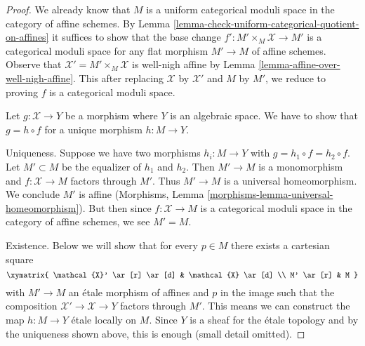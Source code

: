 \begin{proof}
We already know that $M$ is a uniform categorical moduli space
in the category of affine schemes. By
Lemma \ref{lemma-check-uniform-categorical-quotient-on-affines}
it suffices to show that the base change
$f' : M' \times_M \mathcal{X} \to M'$
is a categorical moduli space for any flat morphism
$M' \to M$ of affine schemes.
Observe that $\mathcal{X}' = M' \times_M \mathcal{X}$ is well-nigh affine by
Lemma \ref{lemma-affine-over-well-nigh-affine}.
This after replacing $\mathcal{X}$ by $\mathcal{X}'$
and $M$ by $M'$, we reduce to proving $f$ is a categorical
moduli space.

\medskip\noindent
Let $g : \mathcal{X} \to Y$ be a morphism where $Y$ is an algebraic space.
We have to show that $g = h \circ f$ for a unique morphism $h : M \to Y$.

\medskip\noindent
Uniqueness. Suppose we have two morphisms $h_i : M \to Y$ with
$g = h_1 \circ f = h_2 \circ f$. Let $M' \subset M$ be the equalizer
of $h_1$ and $h_2$. Then $M' \to M$ is a monomorphism and
$f : \mathcal{X} \to M$ factors through $M'$. Thus $M' \to M$
is a universal homeomorphism. We conclude $M'$ is affine
(Morphisms, Lemma \ref{morphisms-lemma-universal-homeomorphism}).
But then since $f : \mathcal{X} \to M$
is a categorical moduli space in the category of affine schemes,
we see $M' = M$.

\medskip\noindent
Existence. Below we will show that for every $p \in M$ there exists
a cartesian square
$$
\xymatrix{
\mathcal{X}' \ar[r] \ar[d] & \mathcal{X} \ar[d] \\
M' \ar[r] & M
}
$$
with $M' \to M$ an \'etale morphism of affines and $p$ in the image such that
the composition $\mathcal{X}' \to \mathcal{X} \to Y$ factors through $M'$.
This means we can construct the map $h : M \to Y$ \'etale locally on $M$.
Since $Y$ is a sheaf for the \'etale topology and by the uniqueness shown
above, this is enough (small detail omitted).


\end{proof}
